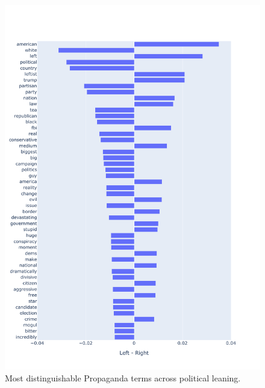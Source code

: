 \begin{figure}[!htbp]
    \centering
    \includegraphics[trim={0 0 0 2cm},clip,width=\linewidth]{figures/baly_prop_tech_words_all_across_leaning_simple.pdf}
    \caption{Most distinguishable Propaganda terms across political leaning.}
    \label{fig:baly_prop_tech_words_all_across_leaning}
\end{figure}

